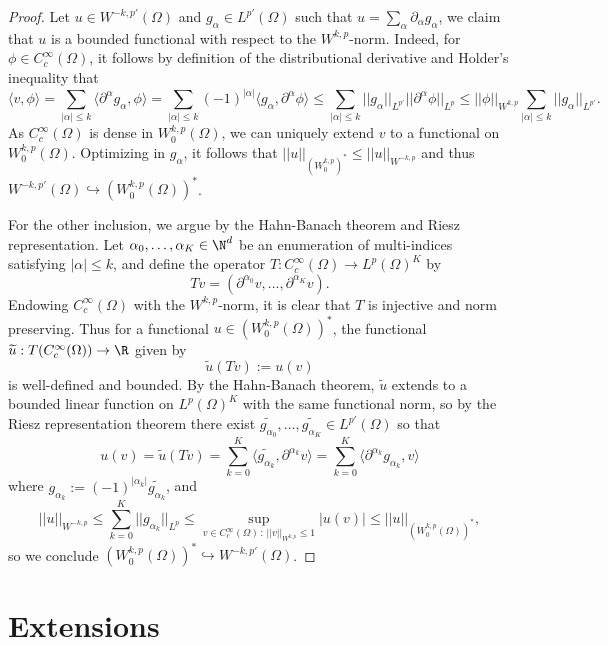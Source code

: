 \documentclass[reqno]{amsart}
\theoremstyle{definition}
\theoremstyle{remark}
\begin{document}
\begin{proof}
	Let $u \in W^{-k, p'} (\Omega)$ and $g_\alpha \in L^{p'} (\Omega)$ such that $u = \sum_\alpha \partial_\alpha g_\alpha$, we claim that $u$ is a bounded functional with respect to the $W^{k, p}$-norm. Indeed, for $\phi \in C^\infty_c (\Omega)$, it follows by definition of the distributional derivative and Holder's inequality that	
		\[ \langle v, \phi \rangle = \sum_{|\alpha| \leq k} \langle \partial^\alpha g_\alpha, \phi \rangle = \sum_{|\alpha| \leq k} (-1)^{|\alpha|}  \langle g_\alpha, \partial^\alpha \phi \rangle \leq \sum_{|\alpha| \leq k} ||g_\alpha||_{L^{p'}} ||\partial^\alpha \phi||_{L^p} \leq ||\phi||_{W^{k, p}} \sum_{|\alpha| \leq k} ||g_\alpha||_{L^{p'}}.\]
	As $C^\infty_c (\Omega)$ is dense in $W^{k, p}_0 (\Omega)$, we can uniquely extend $v$ to a functional on	 $W^{k, p}_0 (\Omega)$. Optimizing in $g_\alpha$, it follows that $||u||_{(W^{k, p}_0)^*} \leq || u||_{W^{-k, p}}$ and thus $W^{-k, p'} (\Omega) \hookrightarrow (W^{k, p}_0 (\Omega))^*$.
		
	For the other inclusion, we argue by the Hahn-Banach theorem and Riesz representation. Let $\alpha_0, \dots, \alpha_K \in \N^d$ be an enumeration of multi-indices satisfying $|\alpha| \leq k$,  and define the operator $T: C^\infty_c (\Omega) \to L^p (\Omega)^K$ by 
		\[ Tv = (\partial^{\alpha_0} v, \dots, \partial^{\alpha_K} v). \]
	Endowing $C^\infty_c (\Omega)$ with the $W^{k, p}$-norm, it is clear that $T$ is injective and norm preserving. Thus for a functional $u \in (W^{k, p}_0 (\Omega))^*$, the functional $\widetilde u : T(C^\infty_c (\Omega)) \to \R$ given by 
		\[ \widetilde u(Tv) := u(v) \]
	is well-defined and bounded. By the Hahn-Banach theorem, $\widetilde u$ extends to a bounded linear function on $L^p (\Omega)^K$ with the same functional norm, so by the Riesz representation theorem there exist $\widetilde{g_{\alpha_0}}, \dots, \widetilde{g_{\alpha_K}} \in L^{p'} (\Omega)$ so that  
		\[ u(v) = \widetilde u (Tv) = \sum_{k = 0}^K \langle \widetilde{g_{\alpha_k}}, \partial^{\alpha_k} v \rangle = \sum_{k = 0}^K \langle \partial^{\alpha_k} g_{\alpha_k}, v \rangle  \]
	where $g_{\alpha_k} := (-1)^{|\alpha_k|} \widetilde{g_{\alpha_k}}$, and 
		\[ ||u||_{W^{-k, p}} \leq \sum_{k = 0}^K ||g_{\alpha_k}||_{L^p} \leq \sup_{v \in C^\infty_c (\Omega) \, : \, ||v||_{W^{k, p}} \leq 1} |u (v)| \leq ||u||_{(W^{k, p}_0 (\Omega))^*}, \]
	so we conclude 	$(W^{k, p}_0 (\Omega))^* \hookrightarrow W^{-k, p'} (\Omega)$. 
\end{proof}

\section{Extensions}	
\end{document}
